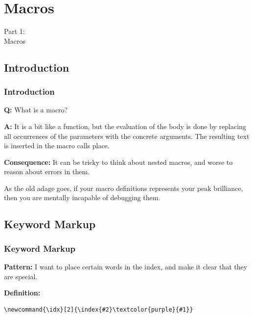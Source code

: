 {
\renewcommand{\bgcolor}{macros}

\section{Macros}
\begin{frame}
  \vspace{25mm}
  \begin{center}
    \Huge{Part 1:\\Macros}
  \end{center}
\end{frame}

\subsection{Introduction}
\begin{frame}[fragile]
  \frametitle{Introduction}
  \vspace{3mm}
  \textbf{Q:} What is a macro?
  
  \pause
  \vspace{5mm}
  \textbf{A:} It is a bit like a function, but the evaluation of the body is done by replacing all occurrences of the parameters with the concrete arguments. The resulting text is inserted in the macro calls place.
  
  \pause
  \vspace{5mm}
  \textbf{Consequence:} It can be tricky to think about nested macros, and worse to reason about errors in them.
  
  \pause
  \vspace{5mm}
  As the old adage goes, if your macro definitions represents your peak brilliance, then you are mentally incapable of debugging them.
\end{frame}

\subsection{Keyword Markup}
\begin{frame}[fragile]
  \frametitle{Keyword Markup}
  \vspace{3mm}
  \textbf{Pattern:} I want to place certain words in the index, and make it clear that they are special.
  
  \vspace{5mm}
  \textbf{Definition:}
  \begin{verbatim}
\newcommand{\idx}[2]{\index{#2}\textcolor{purple}{#1}}
  \end{verbatim}
  

\end{frame}}
